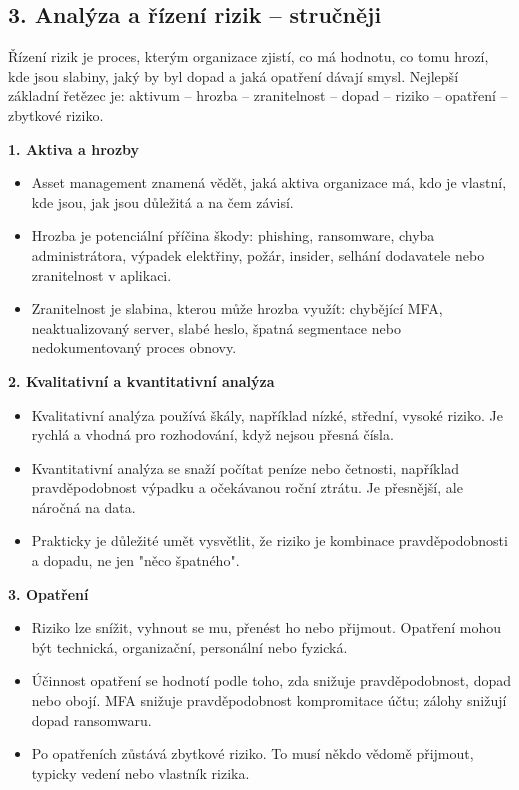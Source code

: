 
\subsection*{3. Analýza a řízení rizik -- stručněji}
Řízení rizik je proces, kterým organizace zjistí, co má hodnotu, co tomu hrozí, kde jsou slabiny, jaký by byl dopad a jaká opatření dávají smysl. Nejlepší základní řetězec je: aktivum -- hrozba -- zranitelnost -- dopad -- riziko -- opatření -- zbytkové riziko.

\textbf{1. Aktiva a hrozby}
\begin{itemize}
  \item Asset management znamená vědět, jaká aktiva organizace má, kdo je vlastní, kde jsou, jak jsou důležitá a na čem závisí.
  \item Hrozba je potenciální příčina škody: phishing, ransomware, chyba administrátora, výpadek elektřiny, požár, insider, selhání dodavatele nebo zranitelnost v aplikaci.
  \item Zranitelnost je slabina, kterou může hrozba využít: chybějící MFA, neaktualizovaný server, slabé heslo, špatná segmentace nebo nedokumentovaný proces obnovy.
\end{itemize}

\textbf{2. Kvalitativní a kvantitativní analýza}
\begin{itemize}
  \item Kvalitativní analýza používá škály, například nízké, střední, vysoké riziko. Je rychlá a vhodná pro rozhodování, když nejsou přesná čísla.
  \item Kvantitativní analýza se snaží počítat peníze nebo četnosti, například pravděpodobnost výpadku a očekávanou roční ztrátu. Je přesnější, ale náročná na data.
  \item Prakticky je důležité umět vysvětlit, že riziko je kombinace pravděpodobnosti a dopadu, ne jen "něco špatného".
\end{itemize}

\textbf{3. Opatření}
\begin{itemize}
  \item Riziko lze snížit, vyhnout se mu, přenést ho nebo přijmout. Opatření mohou být technická, organizační, personální nebo fyzická.
  \item Účinnost opatření se hodnotí podle toho, zda snižuje pravděpodobnost, dopad nebo obojí. MFA snižuje pravděpodobnost kompromitace účtu; zálohy snižují dopad ransomwaru.
  \item Po opatřeních zůstává zbytkové riziko. To musí někdo vědomě přijmout, typicky vedení nebo vlastník rizika.
\end{itemize}

